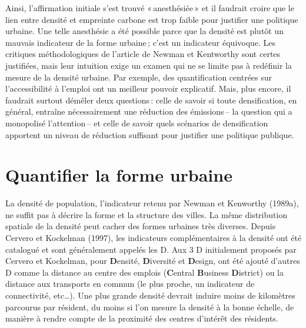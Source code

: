 \documentclass[
  9pt,
  a4paper,
  DIV=11]{scrreprt}
\begin{document}
Ainsi, l'affirmation initiale s'est trouvé «\,anesthésiée\,» et il
faudrait croire que le lien entre densité et empreinte carbone est trop
faible pour justifier une politique urbaine. Une telle anesthésie a été
possible parce que la densité est plutôt un mauvais indicateur de la
forme urbaine\,; c'est un indicateur équivoque. Les critiques
méthodologiques de l'article de Newman et Kentworthy sont certes
justifiées, mais leur intuition exige un examen qui ne se limite pas à
redéfinir la mesure de la densité urbaine. Par exemple, des
quantification centrées sur l'accessibilité à l'emploi ont un meilleur
pouvoir explicatif. Mais, plus encore, il faudrait surtout démêler deux
questions\,: celle de savoir si toute densification, en général,
entraîne nécessairement une réduction des émissions\,-- la question qui
a monopolisé l'attention\,-- et celle de savoir quels scénarios de
densification apportent un niveau de réduction suffisant pour justifier
une politique publique.

\section{Quantifier la forme urbaine}\label{quantifier-la-forme-urbaine}

La densité de population, l'indicateur retenu par Newman et Kenworthy
(1989a), ne suffit pas à décrire la forme et la structure des villes. La
même distribution spatiale de la densité peut cacher des formes urbaines
très diverses. Depuis Cervero et Kockelman (1997), les indicateurs
complémentaires à la densité ont été catalogué et sont généralement
appelés les D. Aux 3 D initialement proposés par Cervero et Kockelman,
pour \textbf{D}ensité, \textbf{D}iversité et \textbf{D}esign, ont été
ajouté d'autres D comme la distance au centre des emplois
(\textbf{C}entral \textbf{B}usiness \textbf{D}istrict) ou la distance
aux transports en commun (le plus proche, un indicateur de connectivité,
etc\ldots). Une plus grande densité devrait induire moins de kilomètres
parcourus par résident, du moins si l'on mesure la densité à la bonne
échelle, de manière à rendre compte de la proximité des centres
d'intérêt des résidents.
\end{document}
